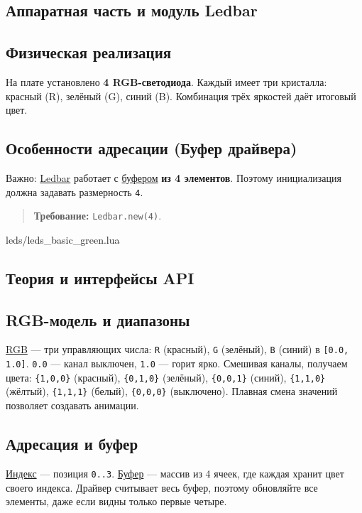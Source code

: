 \subsection{Аппаратная часть и модуль Ledbar}
\subsection{Физическая реализация}
На плате установлено \textbf{4 RGB-светодиода}. Каждый имеет три кристалла: красный (R), зелёный (G), синий (B). Комбинация трёх яркостей даёт итоговый цвет.

\subsection{Особенности адресации (Буфер драйвера)}
Важно: \hyperlink{term:ledbar}{Ledbar} работает с \hyperlink{term:buffer}{буфером} \textbf{из 4 элементов}. Поэтому инициализация должна задавать размерность \verb|4|.
\begin{quote}
\textbf{Требование:} \verb|Ledbar.new(4)|.
\end{quote}
\begin{codefile}{leds/leds_basic_green.lua}
\end{codefile}

\subsection{Теория и интерфейсы API}
\subsection{RGB-модель и диапазоны}
\hyperlink{term:rgb}{RGB} — три управляющих числа: \verb|R| (красный), \verb|G| (зелёный), \verb|B| (синий) в \verb|[0.0, 1.0]|. \verb|0.0| — канал выключен, \verb|1.0| — горит ярко. Смешивая каналы, получаем цвета: \verb|{1,0,0}| (красный), \verb|{0,1,0}| (зелёный), \verb|{0,0,1}| (синий), \verb|{1,1,0}| (жёлтый), \verb|{1,1,1}| (белый), \verb|{0,0,0}| (выключено). Плавная смена значений позволяет создавать анимации.

\subsection{Адресация и буфер}
\hyperlink{term:index}{Индекс} — позиция \verb|0..3|. \hyperlink{term:buffer}{Буфер} — массив из 4 ячеек, где каждая хранит цвет своего индекса. Драйвер считывает весь буфер, поэтому обновляйте все элементы, даже если видны только первые четыре.

